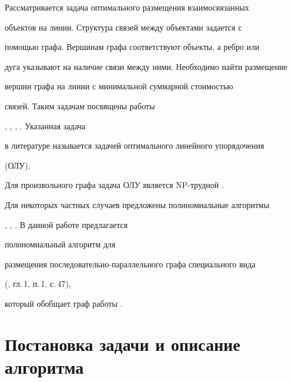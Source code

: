 




\maketitle











Рассматривается задача оптимального размещения взаимосвязанных


объектов на линии. Структура связей между объектами задается с


помощью графа. Вершинам графа соответствуют объекты, а ребро или


дуга указывают на наличие связи между ними. Необходимо найти размещение


вершин графа на линии с минимальной суммарной стоимостью


связей. Таким задачам посвящены работы


\cite{Z1}, \cite{Z2}, \cite{Ado}, \cite{Pic}. Указанная задача


в литературе называется задачей оптимального линейного упорядочения


(ОЛУ).





Для произвольного графа задача ОЛУ является NP-трудной \cite{Ado}.


Для некоторых частных случаев предложены полиномиальные алгоритмы


\cite{Z1}, \cite{Ado}, \cite{Pic}. В данной работе предлагается


полиномиальный алгоритм для


размещения последовательно-параллельного графа специального вида


(\cite{Tan}, гл.\,1, п.\,1, с.\,47), 


который обобщает граф работы \cite{Z1}.





\section{Постановка задачи и описание алгоритма}





